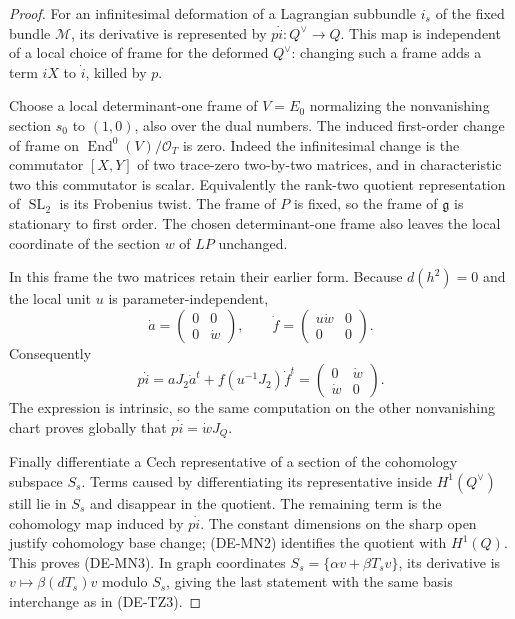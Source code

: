 \begin{proof}
For an infinitesimal deformation of a Lagrangian subbundle $i_s$
of the fixed bundle $\mathcal M$, its derivative is represented
by $p\dot i:Q^\vee\to Q$. This map is independent of a local
choice of frame for the deformed $Q^\vee$: changing such a frame
adds a term $iX$ to $\dot i$, killed by $p$.

Choose a local determinant-one frame of $V=E_0$ normalizing the
nonvanishing section $s_0$ to $(1,0)$, also over the dual numbers.
The induced first-order change of frame on
$\operatorname{End}^0(V)/\mathcal O_T$ is zero. Indeed the
infinitesimal change is the commutator $[X,Y]$ of two trace-zero
two-by-two matrices, and in characteristic two this commutator
is scalar. Equivalently the rank-two quotient representation
of $\operatorname{SL}_2$ is its Frobenius twist. The frame of $P$
is fixed, so the frame of $\mathfrak g$ is stationary to first
order. The chosen determinant-one frame also leaves the local
coordinate of the section $w$ of $LP$ unchanged.

In this frame the two matrices retain their earlier form.
Because $d(h^2)=0$ and the local unit $u$ is parameter-independent,
\[
 \dot a=\begin{pmatrix}0&0\\0&\dot w\end{pmatrix},
 \qquad
 \dot f=\begin{pmatrix}u\dot w&0\\0&0\end{pmatrix}.
\]
Consequently
\[
 p\dot i=aJ_2\dot a^t+f(u^{-1}J_2)\dot f^t
        =\begin{pmatrix}0&\dot w\\\dot w&0\end{pmatrix}.
\]
The expression is intrinsic, so the same computation on the other
nonvanishing chart proves globally that $p\dot i=\dot wJ_Q$.

Finally differentiate a Cech representative of a section of the
cohomology subspace $S_s$. Terms caused by differentiating its
representative inside $H^1(Q^\vee)$ still lie in $S_s$ and
disappear in the quotient. The remaining term is the cohomology
map induced by $p\dot i$. The constant dimensions on the sharp
open justify cohomology base change; (DE-MN2) identifies the
quotient with $H^1(Q)$. This proves (DE-MN3).
In graph coordinates $S_s=\{\alpha v+\beta T_s v\}$, its
derivative is $v\mapsto\beta(dT_s)v$ modulo $S_s$, giving the
last statement with the same basis interchange as in (DE-TZ3).
\end{proof}

